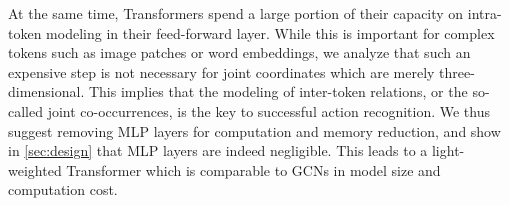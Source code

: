 \documentclass[10pt,twocolumn,letterpaper]{article}
\begin{document}

At the same time, Transformers spend a large portion of their capacity on intra-token modeling in their feed-forward layer. While this is important for complex tokens such as image patches or word embeddings, we analyze that such an expensive step is not necessary for joint coordinates which are merely three-dimensional. This implies that the modeling of inter-token relations, or the so-called joint co-occurrences, is the key to successful action recognition. We thus suggest removing MLP layers for computation and memory reduction, and show in \cref{sec:design} that MLP layers are indeed negligible.
This leads to a light-weighted Transformer which is comparable to GCNs in model size and computation cost. 




\end{document}
